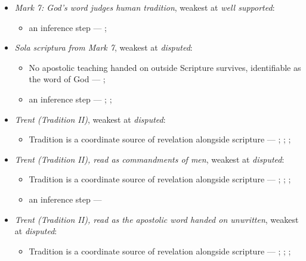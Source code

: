 \documentclass[11pt]{article}
\begin{document}
\begin{itemize}
\item \emph{Mark 7: God's word judges human tradition}, weakest at \emph{well supported}:
\begin{itemize}
\item an inference step --- \cite[Vatican II (1965), Dei Verbum 10]{tanner-decrees-1990}; \cite[IV.x.23]{calvin-institutes-1960}
\end{itemize}
\item \emph{Sola scriptura from Mark 7}, weakest at \emph{disputed}:
\begin{itemize}
\item No apostolic teaching handed on outside Scripture survives, identifiable as the word of God --- \cite[506]{whitaker-disputation-1849}; \cite[I.6]{westminster-confession-1647}
\item an inference step --- \cite{geiselmann-meaning-of-tradition-1966}; \cite[Vatican I (1870), Pastor Aeternus, ch. 4]{tanner-decrees-1990}; \cite{florovsky-bible-church-tradition-1972}
\end{itemize}
\item \emph{Trent (Tradition II)}, weakest at \emph{disputed}:
\begin{itemize}
\item Tradition is a coordinate source of revelation alongside scripture --- \cite[Trent, Session IV (1546), Decree on Sacred Books and Traditions]{tanner-decrees-1990}; \cite{mathison-shape-sola-scriptura-2001}; \cite{geiselmann-meaning-of-tradition-1966}; \cite{congar-tradition-and-traditions-1966}
\end{itemize}
\item \emph{Trent (Tradition II), read as commandments of men}, weakest at \emph{disputed}:
\begin{itemize}
\item Tradition is a coordinate source of revelation alongside scripture --- \cite[Trent, Session IV (1546), Decree on Sacred Books and Traditions]{tanner-decrees-1990}; \cite{mathison-shape-sola-scriptura-2001}; \cite{geiselmann-meaning-of-tradition-1966}; \cite{congar-tradition-and-traditions-1966}
\item an inference step --- \cite[IV.x.23]{calvin-institutes-1960}
\end{itemize}
\item \emph{Trent (Tradition II), read as the apostolic word handed on unwritten}, weakest at \emph{disputed}:
\begin{itemize}
\item Tradition is a coordinate source of revelation alongside scripture --- \cite[Trent, Session IV (1546), Decree on Sacred Books and Traditions]{tanner-decrees-1990}; \cite{mathison-shape-sola-scriptura-2001}; \cite{geiselmann-meaning-of-tradition-1966}; \cite{congar-tradition-and-traditions-1966}
\end{itemize}
\end{itemize}
\end{document}
